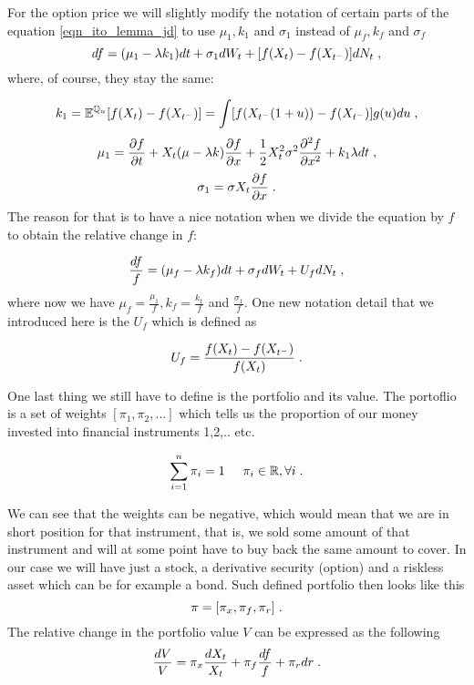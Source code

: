 \documentclass[times, utf8, diplomski]{fer}
\begin{document}
\noindent For the option price we will slightly modify the notation of certain parts of the equation \ref{eqn_ito_lemma_jd} to use $\mu_1, k_1$ and $\sigma_1$ instead of $\mu_f, k_f$ and $\sigma_f$
$$ df = (\mu_1 - \lambda k_1)dt + \sigma_1 dW_t + [f(X_t) - f(X_{t^-})]dN_t  \hspace{0.1cm},$$ where, of course, they stay the same:

$$ k_1 = \mathbb{E}^{\mathbb{Q}_u}[f(X_t) - f(X_{t^-})] = \int[f(X_{t^-}(1 + u)) - f(X_{t^-})]g(u)du \hspace{0.1cm}, $$
$$ \mu_1 = \frac{\partial f}{\partial t} + X_t(\mu - \lambda k)\frac{\partial f}{\partial x} + \frac{1}{2}X_t^2\sigma^2\frac{\partial^2 f}{\partial x^2} + k_1 \lambda dt  \hspace{0.1cm}, $$
$$ \sigma_1 = \sigma X_t\frac{\partial f}{\partial x} \hspace{0.1cm}.$$
The reason for that is to have a nice notation when we divide the equation by $f$ to obtain the relative change in $f$:

\begin{equation} \label{eqn_delta_hedge_f}
	\frac{df}{f} = (\mu_f - \lambda k_f)dt + \sigma_f dW_t + U_fdN_t  \hspace{0.1cm},
\end{equation} where now we have $\mu_f = \frac{\mu_1}{f}, k_f = \frac{k_1}{f}$ and $\frac{\sigma_1}{f}$. One new notation detail that we introduced here is the $U_f$ which is defined as

\begin{equation}
	U_f = \frac{f(X_t) - f(X_{t^-})}{f(X_t)} \hspace{0.1cm}.
\end{equation}

\noindent One last thing we still have to define is the portfolio and its value. The portoflio is a set of weights $[\pi_1, \pi_2, ...]$ which tells us the proportion of our money invested into financial instruments 1,2,.. etc. 

$$ \sum_{i=1}^{n} \pi_i = 1 \hspace{0.5cm} \pi_i \in \mathbb{R},\forall i  \hspace{0.1cm}.$$

\noindent We can see that the weights can be negative, which would mean that we are in short position for that instrument, that is, we sold some amount of that instrument and will at some point have to buy back the same amount to cover. In our case we will have just a stock, a derivative security (option) and a riskless asset which can be for example a bond. Such defined portfolio then looks like this 
$$ \pi = [\pi_x, \pi_f, \pi_r] \hspace{0.1cm}.$$
The relative change in the portfolio value $V$ can be expressed as the following
\begin{equation}\label{eqn_delta_hedge_v}
	\frac{dV}{V} = \pi_x\frac{dX_t}{X_t} + \pi_f\frac{df}{f} + \pi_r dr \hspace{0.1cm}.
\end{equation}
\end{document}
